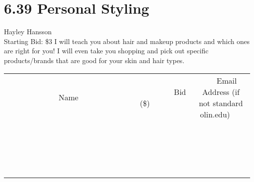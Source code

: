 \documentclass[11pt]{article}
\begin{document}
\section*{6.39 Personal Styling }
Hayley Hansson
\\
Starting Bid: \$3
\newline
I will teach you about hair and makeup products and which ones are right for you! I will even take you shopping and pick out specific products/brands that are good for your skin and hair types.
\\[3ex]
\begin{tabular}{c c c}
~~~~~~~~~~~~~Name~~~~~~~~~~~~~ & ~~~~~~~~~Bid (\$)~~~~~~~~~  & ~~~Email Address (if not standard olin.edu)~~~\\
 & & \\
\hline
 & & \\
\hline
 & & \\
\hline
 & & \\
\hline
 & & \\
\hline
 & & \\
\hline
 & & \\
\hline
 & & \\
\hline
 & & \\
\hline
 & & \\
\hline
 & & \\
\hline
 & & \\
\hline
 & & \\
\hline
 & & \\
\hline
 & & \\
\hline
 & & \\
\hline
 & & \\
\hline
 & & \\
\hline
 & & \\
\hline
\end{tabular}
\newpage
\end{document}

